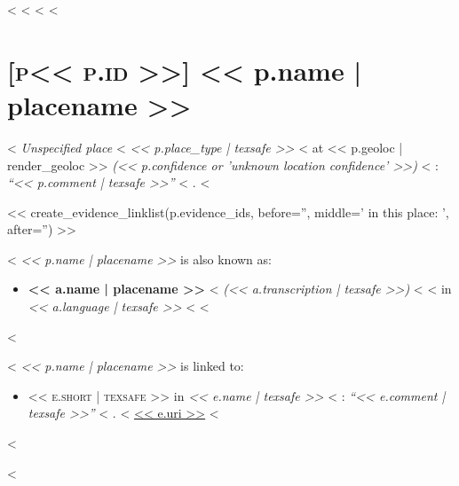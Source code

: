 <%
<%
<%
<%
\section*{\hypertarget{place<<p.id>>}{\textsc{[p<< p.id >>]} << p.name | placename >>}}

<%
  \emph{Unspecified place}
<%
  \emph{<< p.place_type | texsafe >>}
<%
at
<< p.geoloc | render_geoloc >>
\emph{(<< p.confidence or 'unknown location confidence' >>)}
<%
: \emph{\enquote{<< p.comment | texsafe >>}}
<%
.
<%


<< create_evidence_linklist(p.evidence_ids, before='', middle=' in this place: ', after='') >>

<%
  \emph{<< p.name | placename >>} is also known as:

  \begin{itemize}
    <%
    \item
      \textbf{<< a.name | placename >>}
      <%
      \emph{(<< a.transcription | texsafe >>)}
      <%
      <%
      in
      \emph{<< a.language | texsafe >>}
      <%
    <%
  \end{itemize}
<%

<%
  \emph{<< p.name | placename >>} is linked to:

  \begin{itemize}
    <%
    \item
      \textsc{<< e.short | texsafe >>} in
      \emph{<< e.name | texsafe >>}
      <%
      : \emph{\enquote{<< e.comment | texsafe >>}}
      <%
      .
      <%
      \url{<< e.uri >>}
    <%
  \end{itemize}
<%

<%
